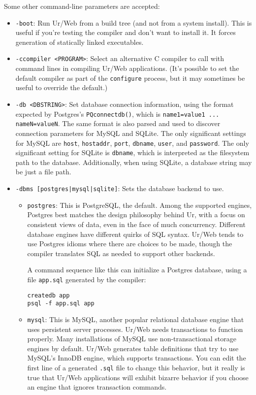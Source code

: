 \documentclass{article}
\begin{document}
Some other command-line parameters are accepted:
\begin{itemize}
\item \texttt{-boot}: Run Ur/Web from a build tree (and not from a system install).  This is useful if you're testing the compiler and don't want to install it.  It forces generation of statically linked executables.

\item \texttt{-ccompiler <PROGRAM>}: Select an alternative C compiler to call with command lines in compiling Ur/Web applications.  (It's possible to set the default compiler as part of the \texttt{configure} process, but it may sometimes be useful to override the default.)

\item \texttt{-db <DBSTRING>}: Set database connection information, using the format expected by Postgres's \texttt{PQconnectdb()}, which is \texttt{name1=value1 ... nameN=valueN}.  The same format is also parsed and used to discover connection parameters for MySQL and SQLite.  The only significant settings for MySQL are \texttt{host}, \texttt{hostaddr}, \texttt{port}, \texttt{dbname}, \texttt{user}, and \texttt{password}.  The only significant setting for SQLite is \texttt{dbname}, which is interpreted as the filesystem path to the database.  Additionally, when using SQLite, a database string may be just a file path.

\item \texttt{-dbms [postgres|mysql|sqlite]}: Sets the database backend to use.
  \begin{itemize}
  \item \texttt{postgres}: This is PostgreSQL, the default.  Among the supported engines, Postgres best matches the design philosophy behind Ur, with a focus on consistent views of data, even in the face of much concurrency.  Different database engines have different quirks of SQL syntax.  Ur/Web tends to use Postgres idioms where there are choices to be made, though the compiler translates SQL as needed to support other backends.

    A command sequence like this can initialize a Postgres database, using a file \texttt{app.sql} generated by the compiler:
    \begin{verbatim}
createdb app
psql -f app.sql app
    \end{verbatim}

  \item \texttt{mysql}: This is MySQL, another popular relational database engine that uses persistent server processes.  Ur/Web needs transactions to function properly.  Many installations of MySQL use non-transactional storage engines by default.  Ur/Web generates table definitions that try to use MySQL's InnoDB engine, which supports transactions.  You can edit the first line of a generated \texttt{.sql} file to change this behavior, but it really is true that Ur/Web applications will exhibit bizarre behavior if you choose an engine that ignores transaction commands.


\end{itemize}
\end{itemize}
\end{document}
